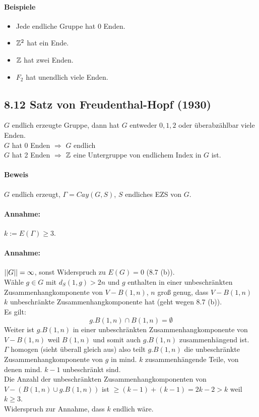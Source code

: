 \documentclass{article}
\begin{document}
\paragraph{Beispiele}
\begin{itemize}
	\item Jede endliche Gruppe hat 0 Enden.
	\item $\mathbb{Z}^2$ hat ein Ende.
	\item $\mathbb{Z}$ hat zwei Enden.
	\item $F_2$ hat unendlich viele Enden.
\end{itemize}

\subsection{8.12 Satz von Freudenthal-Hopf (1930)}
$G$ endlich erzeugte Gruppe, dann hat $G$ entweder $0,1,2$ oder überabzählbar viele Enden.\\
$G$ hat 0 Enden $\Longrightarrow$ $G$ endlich\\
$G$ hat 2 Enden $\Longrightarrow$ $\mathbb{Z}$ eine Untergruppe von endlichem Index in $G$ ist.

\paragraph{Beweis}
$G$ endlich erzeugt, $\Gamma = Cay(G,S)$, $S$ endliches EZS von $G$.

\paragraph{Annahme:} $k := E(\Gamma) \geq 3$.
\paragraph{Annahme:} $\left|\left|G\right|\right| = \infty$, sonst Widerspruch zu $E(G) = 0$ (8.7 (b)).\\
Wähle $g\in G$ mit $d_S(1,g) > 2n$ und $g$ enthalten in einer unbeschränkten Zusammenhangkomponente von $V- B(1,n)$, $n$ groß genug, dass $V-B(1,n)$ $k$ unbeschränkte Zusammenhangkomponente hat (geht wegen 8.7 (b)).\\
Es gilt:
\[g.B(1,n) \cap B(1,n) = \emptyset \]
Weiter ist $g.B(1,n)$ in einer unbeschränkten Zusammenhangkomponente von $V-B(1,n)$ weil $B(1,n)$ und somit auch $g.B(1,n)$ zusammenhängend ist.\\
$\Gamma$ homogen (sieht überall gleich aus) also teilt $g.B(1,n)$ die unbeschränkte Zusammenhangkomponente von $g$ in mind. $k$ zusammenhängende Teile, von denen mind. $k-1$ unbeschränkt sind.\\
Die Anzahl der unbeschränkten Zusammenhangkomponenten von $V- (B(1,n) \cup g.B(1,n))$ ist $\geq (k-1) + (k-1) = 2k - 2 > k$ weil $k \geq 3$.\\
Widerspruch zur Annahme, dass $k$ endlich wäre.\\
\end{document}
